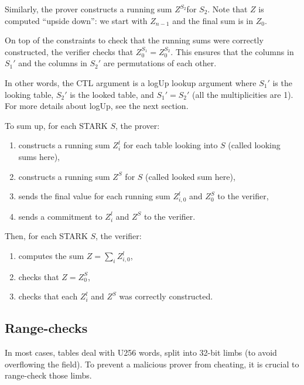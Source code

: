 Similarly, the prover constructs a running sum $Z^{S_2}$for $S_2$. Note that $Z$ is computed ``upside down'': we start with $Z_{n-1}$ and the final sum is in $Z_0$. 

On top of the constraints to check that the running sums were correctly constructed, the verifier checks that $Z^{S_1}_0 = Z^{S_2}_0$.
This ensures that the columns in $S_1'$ and the columns in $S_2'$ are permutations of each other.

In other words, the CTL argument is a logUp lookup argument where $S_1'$ is the looking table, $S_2'$ is the looked table, and $S_1' = S_2'$ (all the multiplicities are 1).
For more details about logUp, see the next section.

To sum up, for each STARK $S$, the prover:
\begin{enumerate}
  \item constructs a running sum $Z_i^l$ for each table looking into $S$ (called looking sums here),
  \item constructs a running sum $Z^S$ for $S$ (called looked sum here),
  \item sends the final value for each running sum $Z_{i, 0}^l$ and $Z^S_0$ to the verifier,
  \item sends a commitment to $Z_i^l$  and $Z^S$ to the verifier.
\end{enumerate}
Then, for each STARK $S$, the verifier:
\begin{enumerate}
  \item computes the sum $Z = \sum_i Z_{i, 0}^l$,
  \item checks that $Z = Z^S_0$,
  \item checks that each $Z_i^l$  and $Z^S$ was correctly constructed.
\end{enumerate}


\subsection{Range-checks}
\label{rc}
In most cases, tables deal with U256 words, split into 32-bit limbs (to avoid overflowing the field). To prevent a malicious prover from cheating, it is crucial to range-check those limbs. 
